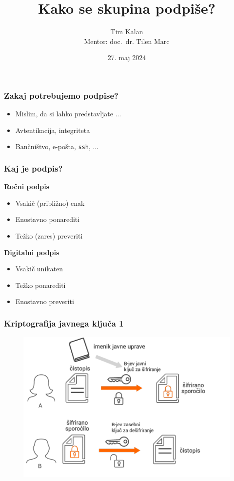 \documentclass{beamer}    %
\author{Tim Kalan \\ \medskip
        \footnotesize Mentor: doc.~dr. Tilen Marc}
\title{Kako se skupina podpiše?}
\date{27. maj 2024}
\begin{document}
\begin{frame}
    \titlepage
\end{frame}

\begin{frame}
    \frametitle{Zakaj potrebujemo podpise?}
    \begin{itemize}
        \item Mislim, da si lahko predstavljate ... 
        \item Avtentikacija, integriteta
        \item Bančništvo, e-pošta, \texttt{ssh}, ...
    \end{itemize}
\end{frame}

\begin{frame}
    \frametitle{Kaj je podpis?}
    \begin{multicols*}{2}
        \textbf{Ročni podpis}
        \begin{itemize}
            \item Vsakič (približno) enak
            \item Enostavno ponarediti
            \item Težko (zares) preveriti
        \end{itemize}
        \columnbreak

        \textbf{Digitalni podpis}
        \begin{itemize}
            \item Vsakič unikaten
            \item Težko ponarediti
            \item Enostavno preveriti
        \end{itemize}
    \end{multicols*}
\end{frame}

\begin{frame}
    \frametitle{Kriptografija javnega ključa 1}
    \begin{figure}
        \includegraphics[width=\textwidth]{images/enkripcija.png}
    \end{figure}
\end{frame}
\end{document}
